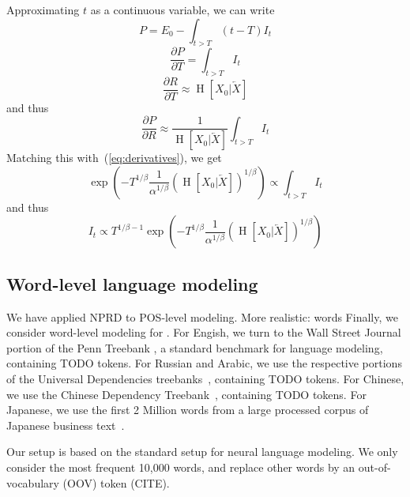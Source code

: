 \documentclass[11pt,letterpaper]{article}
\begin{document}
Approximating $t$ as a continuous variable, we can write
\begin{equation}
	P =	E_0 - \int_{t > T} (t-T) I_t
\end{equation}
\begin{equation}
	\frac{\partial P}{\partial T} =	\int_{t > T} I_t
\end{equation}
\begin{equation}
	\frac{\partial R}{\partial T} \approx \operatorname{H}[X_0|\overleftarrow{X}]
\end{equation}
and thus
\begin{equation}
	\frac{\partial P}{\partial R} \approx	\frac{1}{\operatorname{H}[X_0|\overleftarrow{X}]} \int_{t > T} I_t
\end{equation}
Matching this with~(\ref{eq:derivatives}), we get
\begin{equation}
	\exp\left(-T^{1/\beta} \frac{1}{\alpha^{1/\beta}} (\operatorname{H}[X_0|\overleftarrow{X}])^{1/\beta}\right) \propto \int_{t > T} I_t
\end{equation}
and thus
\begin{equation}
I_t \propto T^{1/\beta-1}	\exp\left(-T^{1/\beta} \frac{1}{\alpha^{1/\beta}} (\operatorname{H}[X_0|\overleftarrow{X}])^{1/\beta}\right)
\end{equation}


\subsection{Word-level language modeling}


We have applied NPRD to POS-level modeling.
More realistic: words
Finally, we consider word-level modeling for .
For Engish, we turn to the Wall Street Journal portion of the Penn Treebank \citep{marcus-building-1993}, a standard benchmark for language modeling, containing TODO tokens.
For Russian and Arabic, we use the respective portions of the Universal Dependencies treebanks~\citep{nivre-universal-2016}, containing TODO tokens.
For Chinese, we use the Chinese Dependency Treebank~\cite{che2012chinese}, containing TODO tokens.
For Japanese, we use the first 2 Million words from a large processed corpus of Japanese business text~\cite{graff1995japanese}.

Our setup is based on the standard setup for neural language modeling.
We only consider the most frequent 10,000 words, and replace other words by an out-of-vocabulary (OOV) token (CITE).
\end{document}

